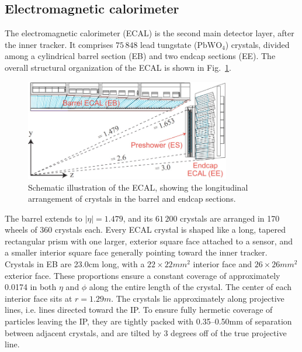 \documentclass[oneside, letterpaper, 12pt, oldfontcommands]{memoir}
\begin{document}
\subsection{Electromagnetic calorimeter} \label{sec:LHCCMS_CMS_ECAL}
The electromagnetic calorimeter (ECAL) is the second main detector layer, after the inner tracker. It comprises $75\,848$ lead tungstate ($\mathrm{PbWO}_{4}$)
crystals, divided among a cylindrical barrel section (EB) and two endcap sections (EE). The overall structural organization of the ECAL is shown in Fig.~\ref{fig:ecal_schematic}.

\begin{figure}[hbtp]
  \begin{center}
    \includegraphics[width=0.80\textwidth]{Figures/ecal_schematic.png}
    \caption{Schematic illustration of the ECAL, showing the longitudinal arrangement of crystals in the barrel and endcap sections.}
    \label{fig:ecal_schematic}
  \end{center}
\end{figure}

The barrel extends to $|\eta| = 1.479$,
and its $61\,200$ crystals are arranged in 170 wheels of 360 crystals each. Every ECAL crystal is shaped like a long, tapered rectangular prism with one
larger, exterior square face attached to a sensor, and a smaller interior square face generally pointing toward the inner tracker. Crystals in EB
are 23.0\unit{cm} long, with a $22{\times}22\unit{mm^2}$ interior face and $26{\times}26\unit{mm^2}$ exterior face. These proportions ensure
a constant coverage of approximately 0.0174 in both $\eta$ and $\phi$ along the entire length of the crystal. The center of each interior face sits at $r = 1.29\unit{m}$.
The crystals lie approximately along projective lines, i.e. lines directed toward the IP. To ensure fully hermetic coverage of particles leaving the IP,
they are tightly packed with 0.35--0.50\unit{mm} of separation between adjacent crystals, and are tilted by 3 degrees off of the true projective line.
\end{document}
